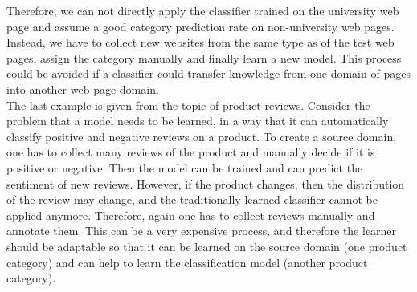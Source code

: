 Therefore, we can not directly apply the classifier trained on the university web page and assume a good category prediction rate on non-university web pages.
Instead, we have to collect new websites from the same type as of the test web pages, assign the category manually and finally learn a new model.
This process could be avoided if a classifier could transfer knowledge from one domain of pages into another web page domain.\cite{Pan.2010}\\
The last example is given from the topic of product reviews.
Consider the problem that a model needs to be learned, in a way that it can automatically classify positive and negative reviews on a product.
To create a source domain, one has to collect many reviews of the product and manually decide if it is positive or negative.
Then the model can be trained and can predict the sentiment of new reviews.
However, if the product changes, then the distribution of the review may change, and the traditionally learned classifier cannot be applied anymore.
Therefore, again one has to collect reviews manually and annotate them.
This can be a very expensive process, and therefore the learner should be adaptable so that it can be learned on the source domain (one product category) and can help to learn the classification model (another product category).\cite{Pan.2010}

